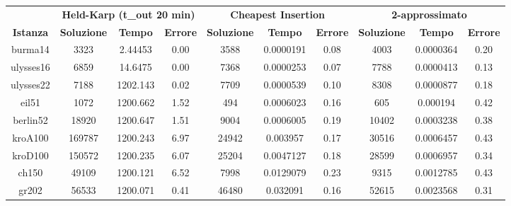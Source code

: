 \begin{longtable}{|c|c|c|c|c|c|c|c|c|c|}
\hline
\textbf{}        & \multicolumn{3}{c|}{\textbf{Held-Karp (t\_out 20 min)}}                   & \multicolumn{3}{c|}{\textbf{Cheapest Insertion}}          & \multicolumn{3}{c|}{\textbf{2-approssimato}}              \\ \cline{2-10} 
\textbf{Istanza} & \textbf{Soluzione} & \textbf{Tempo} & \textbf{Errore} & \textbf{Soluzione} & \textbf{Tempo} & \textbf{Errore} & \textbf{Soluzione} & \textbf{Tempo} & \textbf{Errore} \\ \hline
burma14      & 3323               & 2.44453            & 0.00          & 3588               & 0.0000191          & 0.08          & 4003               & 0.0000364          & 0.20          \\ \hline
ulysses16    & 6859               & 14.6475            & 0.00          & 7368               & 0.0000253          & 0.07          & 7788               & 0.0000413          & 0.13          \\ \hline
ulysses22    & 7188               & 1202.143           & 0.02          & 7709               & 0.0000539          & 0.10          & 8308               & 0.0000877          & 0.18          \\ \hline
eil51        & 1072               & 1200.662           & 1.52          & 494                & 0.0006023          & 0.16          & 605                & 0.000194           & 0.42          \\ \hline
berlin52     & 18920              & 1200.647           & 1.51          & 9004               & 0.0006005          & 0.19          & 10402              & 0.0003238          & 0.38          \\ \hline
kroA100      & 169787             & 1200.243           & 6.97          & 24942              & 0.003957           & 0.17          & 30516              & 0.0006457          & 0.43          \\ \hline
kroD100      & 150572             & 1200.235           & 6.07          & 25204              & 0.0047127          & 0.18          & 28599              & 0.0006957          & 0.34          \\ \hline
ch150        & 49109              & 1200.121           & 6.52          & 7998               & 0.0129079          & 0.23          & 9315               & 0.0012785          & 0.43          \\ \hline
gr202        & 56533              & 1200.071           & 0.41          & 46480              & 0.032091           & 0.16          & 52615              & 0.0023568          & 0.31          \\ \hline

\end{longtable}
